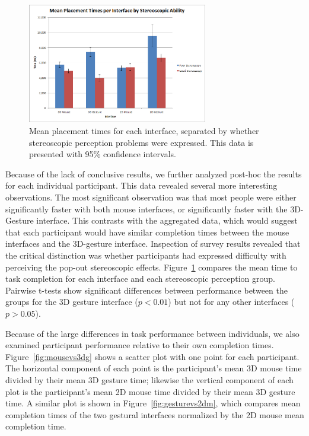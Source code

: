 \documentclass[pageno]{jpaper}
\begin{document}
\begin{figure}
\centering
\includegraphics[width=0.7\textwidth]{figures/mean.png}
\caption{Mean placement times for each interface, separated by whether
stereoscopic perception problems were expressed. This data is presented with 95\% confidence intervals.}
\label{fig:sepmean}
\end{figure}
Because of the lack of conclusive results, we further analyzed post-hoc the results for each individual participant. This data revealed several more interesting observations.
The most significant observation was that most people were either significantly faster with both mouse interfaces, or significantly faster with the 3D-Gesture interface.
This contrasts with the aggregated data, which would suggest that each participant would have similar completion times between the mouse interfaces and the 3D-gesture
interface. Inspection of survey results revealed that the critical distinction
was whether participants had expressed difficulty with perceiving
the pop-out stereoscopic effects. Figure~\ref{fig:sepmean} compares the mean
time to task completion for each interface and each stereoscopic perception
group. Pairwise t-tests show significant differences between performance between
the groups for the 3D gesture interface ($p < 0.01$) but not for any other
interfaces ($p > 0.05$).

Because of the large differences in task performance between individuals, we
also examined participant performance relative to their own completion times.
Figure~\ref{fig:mousevs3dg} shows a scatter plot with one point for each
participant. The horizontal component of each point is the participant's mean 3D
mouse time divided by their mean 3D gesture time; likewise the vertical
component of each plot is the participant's mean 2D mouse time divided by their
mean 3D gesture time. A similar plot is shown in Figure~\ref{fig:gesturevs2dm},
which compares mean completion times of the two gestural interfaces normalized
by the 2D mouse mean completion time.
\end{document}
